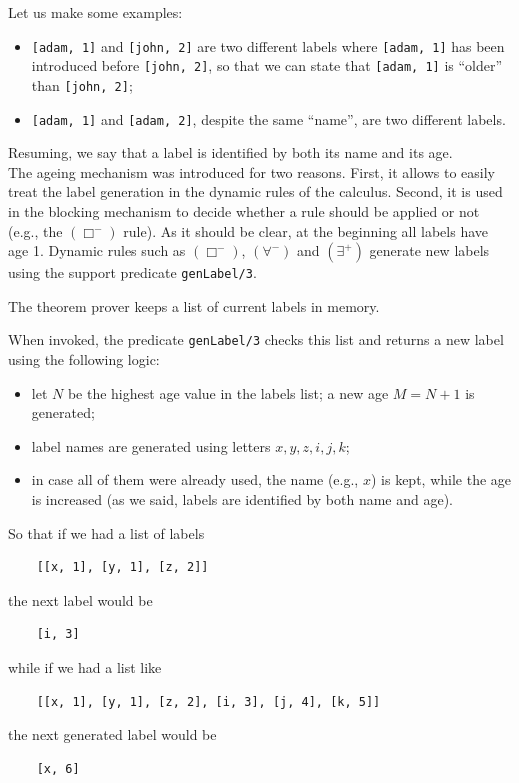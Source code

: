 \documentclass[a4paper, 11pt, oneside]{duthesis}
\newcommand{\perogni} {\forall}
\newcommand{\esiste} {\exists}
\begin{document}
Let us make some examples:
\begin{itemize}
\item \texttt{[adam, 1]} and \texttt{[john, 2]} are two different labels where \texttt{[adam, 1]} has been introduced before \texttt{[john, 2]}, so that we can state that \texttt{[adam, 1]} is ``older'' than \texttt{[john, 2]};

\item \texttt{[adam, 1]} and \texttt{[adam, 2]}, despite the same ``name'', are two different labels.
\end{itemize}
Resuming, we say that a label is identified by both its name and its age.\\

The ageing mechanism was introduced for two reasons.
First, it allows to easily treat the label generation in the dynamic rules of the calculus.
Second, it is used in the blocking mechanism to decide whether a rule should be applied or not (e.g., the $(\Box^-)$ rule).
As it should be clear, at the beginning all labels have age 1. Dynamic rules such as $(\Box^-)$, $(\perogni^-)$ and $(\esiste^+)$ generate new labels using the support predicate \texttt{genLabel/3}.

The theorem prover keeps a list of current labels in memory.


When invoked, the predicate \texttt{genLabel/3} checks this list and returns a new label using the following logic:
\begin{itemize}
\item let $N$ be the highest age value in the labels list; a new age $M = N + 1$ is generated;
\item label names are generated using letters $x,y,z,i,j,k$;
\item in case all of them were already used, the name (e.g., $x$) is kept, while the age is increased (as we said, labels are identified by both name and age).
\end{itemize}
So that if we had a list of labels
\begin{verbatim}
    [[x, 1], [y, 1], [z, 2]]
\end{verbatim}
the next label would be
\begin{verbatim}
    [i, 3]
\end{verbatim}
while if we had a list like
\begin{verbatim}
    [[x, 1], [y, 1], [z, 2], [i, 3], [j, 4], [k, 5]]
\end{verbatim}
the next generated label would be
\begin{verbatim}
    [x, 6]
\end{verbatim}
\end{document}
